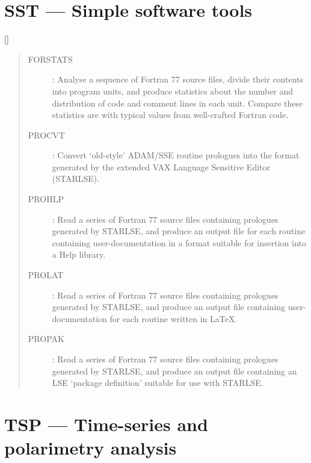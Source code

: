 \newpage

\section{SST --- Simple software tools}

\vspace{-10mm}

\hfill []

\vspace{2mm}

\begin{quote}
\begin{description}
\item [FORSTATS] : Analyse a sequence of Fortran 77 source files, divide
 their contents into program units, and produce statistics about the number
 and distribution of code and comment lines in each unit.
 Compare these statistics are with typical values from well-crafted Fortran
 code.

\item [PROCVT] : Convert `old-style' ADAM/SSE routine prologues into the
 format generated by the extended VAX Language Sensitive Editor (STARLSE).

\item [PROHLP] : Read a series of Fortran 77 source files containing
 prologues generated by STARLSE, and produce an output file for each routine
 containing user-documentation in a format suitable for insertion into 
 a Help library.

\item [PROLAT] : Read a series of Fortran 77 source files containing
 prologues generated by STARLSE, and produce an output file containing
 user-documentation for each routine written in \LaTeX.

\item [PROPAK] : Read a series of Fortran 77 source files containing
 prologues generated by STARLSE, and produce an output file containing
 an LSE `package definition' suitable for use with STARLSE.

\end{description}
\end{quote}

\newpage

\section{TSP --- Time-series and polarimetry analysis}

